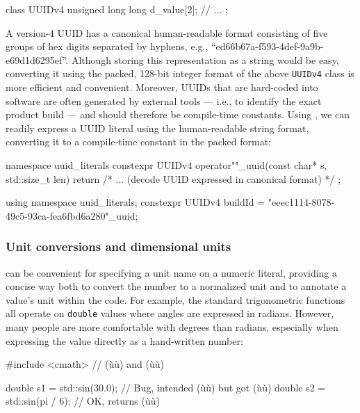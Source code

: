 \begin{emcppslisting}
class UUIDv4
{
    unsigned long long d_value[2];
    // ...
};
\end{emcppslisting}
    
\noindent A version-4 UUID has a canonical human-readable format consisting of
five groups of hex digits separated by hyphens, e.g.,
``ed66b67a-f593-4def-9a9b-e69d1d6295ef''. Although storing this
representation as a string would be easy, converting it using the
packed, 128-bit integer format of the above \lstinline!UUIDv4! class is
more efficient and convenient. Moreover, UUIDs that are hard-coded into
software are often generated by external tools --- i.e., to identify the
exact product build --- and should therefore be compile-time constants.
Using , we can readily express a UUID literal using the
human-readable string format, converting it to a compile-time constant
in the packed format:

\begin{emcppslisting}
namespace uuid_literals
{
    constexpr UUIDv4 operator""_uuid(const char* s, std::size_t len)
    {
        return { /* ... (decode UUID expressed in canonical format) */ };
    }
}

using namespace uuid_literals;
constexpr UUIDv4 buildId = "eeec1114-8078-49c5-93ca-fea6fbd6a280"_uuid;
\end{emcppslisting}
    

\subsubsection[Unit conversions and dimensional units]{Unit conversions and dimensional units}\label{unit-conversions-and-dimensional-units}

 can be convenient for specifying a unit name on a numeric
literal, providing a concise way both to convert the number to a
normalized unit and to annotate a value's unit within the code. For
example, the standard trigonometric functions all operate on
\lstinline!double! values where angles are expressed in radians. However,
many people are more comfortable with degrees than radians, especially
when expressing the value directly as a hand-written number:

\begin{emcppslisting}
#include <cmath>  // (ù{}ù) and (ù{}ù)

double s1 = std::sin(30.0);    // Bug, intended (ù{}ù) but got (ù{}ù)
double s2 = std::sin(pi / 6);  // OK, returns (ù{}ù)
\end{emcppslisting}
    
